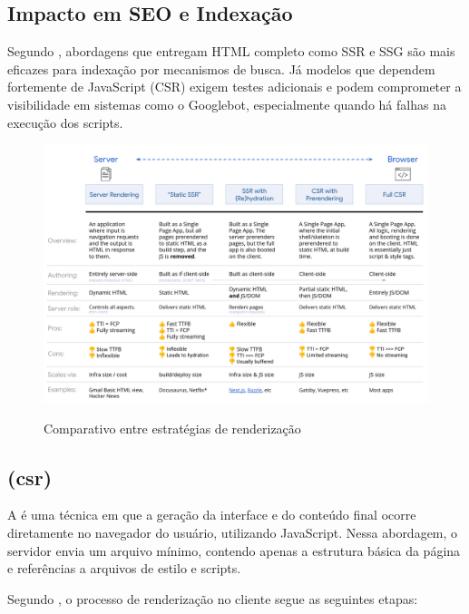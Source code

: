 \subsection*{Impacto em SEO e Indexação}

Segundo , abordagens que entregam HTML completo como SSR e SSG são mais eficazes para indexação por mecanismos de busca. Já modelos que dependem fortemente de JavaScript (CSR) exigem testes adicionais e podem comprometer a visibilidade em sistemas como o Googlebot, especialmente quando há falhas na execução dos scripts.

\begin{figure}[H]
  \centering
  \caption{Comparativo entre estratégias de renderização}
  \includegraphics[width=\textwidth]{media/rendering_comparison_table.png}
  \label{fig:comparativo_renderizacao}
\end{figure}



\subsection{ (\acrshort{csr})}
\label{subsec:csr}

A \textbf{} é uma técnica em que a geração da interface e do conteúdo final ocorre diretamente no navegador do usuário, utilizando JavaScript. Nessa abordagem, o servidor envia um arquivo  mínimo, contendo apenas a estrutura básica da página e referências a arquivos de estilo e scripts.{\cite{atori2024}}

Segundo , o processo de renderização no cliente segue as seguintes etapas:

